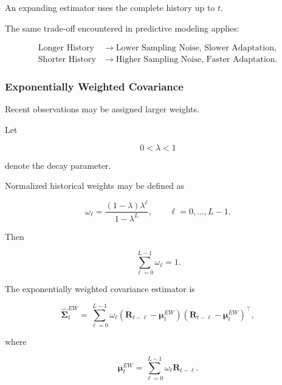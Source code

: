 \documentclass[11pt,a4paper]{article}
\begin{document}
An expanding estimator uses the complete history up to $t$.

The same trade-off encountered in predictive modeling applies:

\begin{equation}
\boxed{
\begin{aligned}
\text{Longer History}
&\rightarrow
\text{Lower Sampling Noise, Slower Adaptation},
\\
\text{Shorter History}
&\rightarrow
\text{Higher Sampling Noise, Faster Adaptation}.
\end{aligned}
}
\end{equation}


\subsubsection{Exponentially Weighted Covariance}

Recent observations may be assigned larger weights.

Let

\begin{equation}
0<\lambda<1
\end{equation}

denote the decay parameter.

Normalized historical weights may be defined as

\begin{equation}
\omega_\ell
=
\frac{
(1-\lambda)\lambda^\ell
}{
1-\lambda^L
},
\qquad
\ell=0,\ldots,L-1.
\end{equation}

Then

\begin{equation}
\sum_{\ell=0}^{L-1}
\omega_\ell
=
1.
\end{equation}

The exponentially weighted covariance estimator is

\begin{equation}
\boxed{
\widehat{\boldsymbol{\Sigma}}_t^{EW}
=
\sum_{\ell=0}^{L-1}
\omega_\ell
\left(
\mathbf{R}_{t-\ell}
-
\boldsymbol{\mu}_{t}^{EW}
\right)
\left(
\mathbf{R}_{t-\ell}
-
\boldsymbol{\mu}_{t}^{EW}
\right)^\top,
}
\end{equation}

where

\begin{equation}
\boldsymbol{\mu}_{t}^{EW}
=
\sum_{\ell=0}^{L-1}
\omega_\ell
\mathbf{R}_{t-\ell}.
\end{equation}
\end{document}
